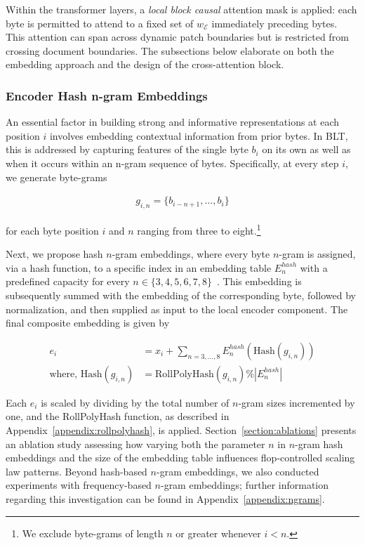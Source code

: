 Within the transformer layers, a \textit{local block causal} attention mask is applied: each byte is permitted to attend to a fixed set of $w_{\mathcal{E}}$ immediately preceding bytes. This attention can span across dynamic patch boundaries but is restricted from crossing document boundaries. The subsections below elaborate on both the embedding approach and the design of the cross-attention block.

\subsubsection{Encoder Hash n-gram Embeddings}
\label{sec:ngram-emb}
\label{sec:hash-emb}
An essential factor in building strong and informative representations at each position $i$ involves embedding contextual information from prior bytes. In {\textsc BLT}, this is addressed by capturing features of the single byte $b_i$ on its own as well as when it occurs within an n-gram sequence of bytes. Specifically, at every step $i$, we generate byte-grams

\begin{align}
    g_{i,n}=\{b_{i-n + 1},\ldots, b_i\}
\end{align}

for each byte position $i$ and $n$ ranging from three to eight.\footnote{
We exclude byte-grams of length $n$ or greater whenever $i < n$. }

Next, we propose hash $n$-gram embeddings, where every byte $n$-gram is assigned, via a hash function, to a specific index in an embedding table $E_{n}^{hash}$ with a predefined capacity for every $n \in\{3,4,5,6,7,8\}$~\citep{bai2010learning}.
This embedding is subsequently summed with the embedding of the corresponding byte, followed by normalization, and then supplied as input to the local encoder component. The final composite embedding is given by

\begin{align}
e_i &= x_i + \sum_{n = 3,...,8}E_{n}^{hash}(\text{Hash}(g_{i,n})) \\
\text{where, Hash}(g_{i,n}) &= \text{RollPolyHash}(g_{i,n}) \% |E_{n}^{hash}|
\end{align}

Each $e_i$ is scaled by dividing by the total number of $n$-gram sizes incremented by one, and the RollPolyHash function, as described in Appendix~\ref{appendix:rollpolyhash}, is applied. Section~\ref{section:ablations} presents an ablation study assessing how varying both the parameter $n$ in $n$-gram hash embeddings and the size of the embedding table influences flop-controlled scaling law patterns. Beyond hash-based $n$-gram embeddings, we also conducted experiments with frequency-based $n$-gram embeddings; further information regarding this investigation can be found in Appendix~\ref{appendix:ngrams}.

